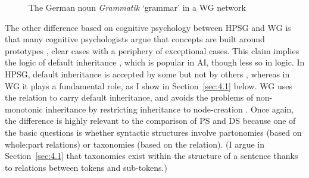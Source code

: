 \documentclass[output=paper
 	        ,biblatex
                ,babelshorthands
                ,newtxmath
                ,draftmode
                ,colorlinks, citecolor=brown
]{langscibook}
\begin{document}
\begin{figure}
	\centering
{}
	\caption{The German noun \emph{Grammatik} `grammar' in a WG network}
	\label{fig:7}
\end{figure}

The other difference based on cognitive psychology between HPSG and WG is that many cognitive psychologists argue that concepts are built around prototypes \citep{Rosch1973,Taylor1995}, clear cases with a periphery of exceptional cases. This claim implies the logic of default inheritance \citep{BCdP93a-ed}, which is popular in AI, though less so in logic. In HPSG, default inheritance is accepted by some \citep{LC99a} but not by others \citep[403]{MuellerGT-Eng2}, whereas in WG it plays a fundamental role, as I show in Section~\ref{sec:4.1} below. WG uses the  relation to carry default inheritance, and avoids the problems of non-monotonic inheritance by restricting inheritance to node-creation \citep[18]{Hudson2018a}. Once again, the difference is highly relevant to the comparison of PS and DS because one of the basic questions is whether syntactic structures involve partonomies (based on whole:part relations) or taxonomies (based on the  relation). (I argue in Section~\ref{sec:4.1} that taxonomies exist within the structure of a sentence thanks to  relations between tokens and sub-tokens.)
\end{document}

